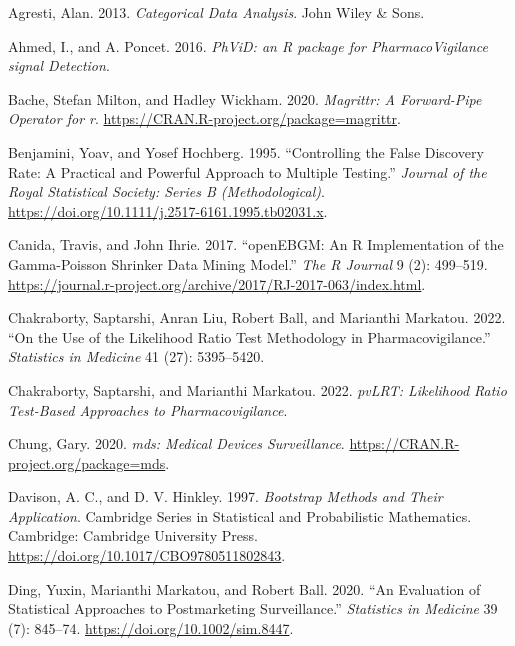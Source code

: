 \hypertarget{refs}{}
\begin{CSLReferences}{1}{0}
\leavevmode{}%
Agresti, Alan. 2013. \emph{Categorical Data Analysis}. John Wiley \& Sons.

\leavevmode{}%
Ahmed, I., and A. Poncet. 2016. \emph{{PhViD: an R package for PharmacoVigilance signal Detection}}.

\leavevmode{}%
Bache, Stefan Milton, and Hadley Wickham. 2020. \emph{Magrittr: A Forward-Pipe Operator for r}. \url{https://CRAN.R-project.org/package=magrittr}.

\leavevmode{}%
Benjamini, Yoav, and Yosef Hochberg. 1995. {``Controlling the False Discovery Rate: A Practical and Powerful Approach to Multiple Testing.''} \emph{Journal of the Royal Statistical Society: Series B (Methodological)}. \url{https://doi.org/10.1111/j.2517-6161.1995.tb02031.x}.

\leavevmode{}%
Canida, Travis, and John Ihrie. 2017. {``{openEBGM: An R Implementation of the Gamma-Poisson Shrinker Data Mining Model}.''} \emph{The R Journal} 9 (2): 499--519. \url{https://journal.r-project.org/archive/2017/RJ-2017-063/index.html}.

\leavevmode{}%
Chakraborty, Saptarshi, Anran Liu, Robert Ball, and Marianthi Markatou. 2022. {``On the Use of the Likelihood Ratio Test Methodology in Pharmacovigilance.''} \emph{Statistics in Medicine} 41 (27): 5395--5420.

\leavevmode{}%
Chakraborty, Saptarshi, and Marianthi Markatou. 2022. \emph{pvLRT: Likelihood Ratio Test-Based Approaches to Pharmacovigilance}.

\leavevmode{}%
Chung, Gary. 2020. \emph{{mds: Medical Devices Surveillance}}. \url{https://CRAN.R-project.org/package=mds}.

\leavevmode{}%
Davison, A. C., and D. V. Hinkley. 1997. \emph{Bootstrap Methods and Their Application}. Cambridge Series in Statistical and Probabilistic Mathematics. Cambridge: Cambridge University Press. \url{https://doi.org/10.1017/CBO9780511802843}.

\leavevmode{}%
Ding, Yuxin, Marianthi Markatou, and Robert Ball. 2020. {``An Evaluation of Statistical Approaches to Postmarketing Surveillance.''} \emph{Statistics in Medicine} 39 (7): 845--74. \url{https://doi.org/10.1002/sim.8447}.


\end{CSLReferences}
